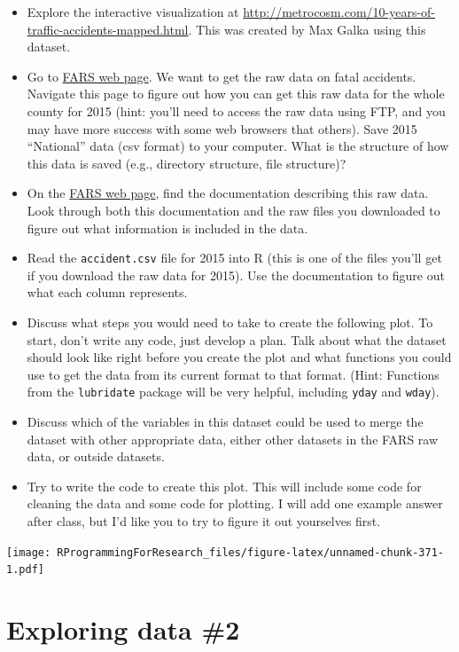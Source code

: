 \documentclass[]{book}
\providecommand{\tightlist}{%
  \setlength{\itemsep}{0pt}\setlength{\parskip}{0pt}}
\theoremstyle{definition}
\theoremstyle{definition}
\theoremstyle{definition}
\theoremstyle{remark}
\begin{document}
\begin{itemize}
\tightlist
\item
  Explore the interactive visualization at
  \url{http://metrocosm.com/10-years-of-traffic-accidents-mapped.html}.
  This was created by Max Galka using this dataset.
\item
  Go to \href{http://www.nhtsa.gov/FARS}{FARS web page}. We want to get
  the raw data on fatal accidents. Navigate this page to figure out how
  you can get this raw data for the whole county for 2015 (hint: you'll
  need to access the raw data using FTP, and you may have more success
  with some web browsers that others). Save 2015 ``National'' data (csv
  format) to your computer. What is the structure of how this data is
  saved (e.g., directory structure, file structure)?
\item
  On the \href{http://www.nhtsa.gov/FARS}{FARS web page}, find the
  documentation describing this raw data. Look through both this
  documentation and the raw files you downloaded to figure out what
  information is included in the data.
\item
  Read the \texttt{accident.csv} file for 2015 into R (this is one of
  the files you'll get if you download the raw data for 2015). Use the
  documentation to figure out what each column represents.
\item
  Discuss what steps you would need to take to create the following
  plot. To start, don't write any code, just develop a plan. Talk about
  what the dataset should look like right before you create the plot and
  what functions you could use to get the data from its current format
  to that format. (Hint: Functions from the \texttt{lubridate} package
  will be very helpful, including \texttt{yday} and \texttt{wday}).
\item
  Discuss which of the variables in this dataset could be used to merge
  the dataset with other appropriate data, either other datasets in the
  FARS raw data, or outside datasets.
\item
  Try to write the code to create this plot. This will include some code
  for cleaning the data and some code for plotting. I will add one
  example answer after class, but I'd like you to try to figure it out
  yourselves first.
\end{itemize}

\texttt{[image: RProgrammingForResearch\_files/figure-latex/unnamed-chunk-371-1.pdf]}

\chapter{Exploring data \#2}\label{exploring-data-2}
\end{document}
